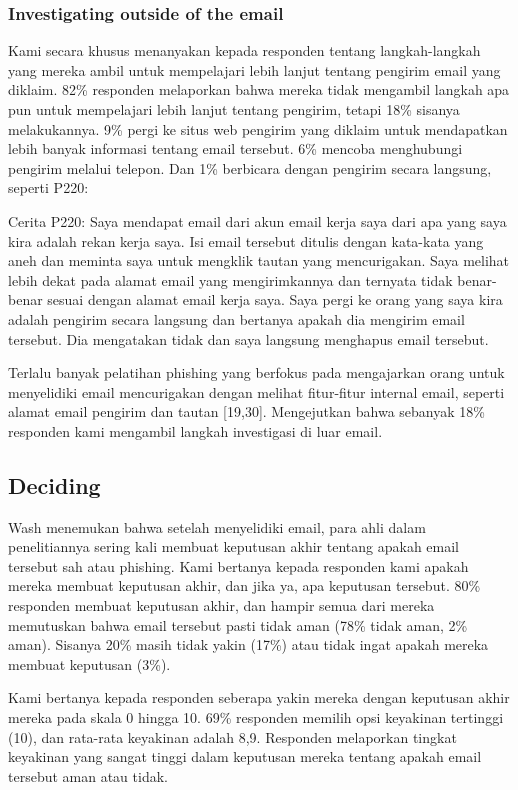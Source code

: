 \documentclass[lettersize,journal]{IEEEtran}
\begin{document}
\subsubsection{Investigating outside of the email}

Kami secara khusus menanyakan kepada responden tentang langkah-langkah yang
mereka ambil untuk mempelajari lebih lanjut tentang pengirim email yang
diklaim. 82\% responden melaporkan bahwa mereka tidak mengambil langkah apa pun
untuk mempelajari lebih lanjut tentang pengirim, tetapi 18\% sisanya
melakukannya. 9\% pergi ke situs web pengirim yang diklaim untuk mendapatkan
lebih banyak informasi tentang email tersebut. 6\% mencoba menghubungi pengirim
melalui telepon. Dan 1\% berbicara dengan pengirim secara langsung, seperti
P220:

Cerita P220: Saya mendapat email dari akun email kerja saya dari apa yang saya
kira adalah rekan kerja saya. Isi email tersebut ditulis dengan kata-kata yang
aneh dan meminta saya untuk mengklik tautan yang mencurigakan. Saya melihat
lebih dekat pada alamat email yang mengirimkannya dan ternyata tidak
benar-benar sesuai dengan alamat email kerja saya. Saya pergi ke orang yang
saya kira adalah pengirim secara langsung dan bertanya apakah dia mengirim
email tersebut. Dia mengatakan tidak dan saya langsung menghapus email
tersebut.

Terlalu banyak pelatihan phishing yang berfokus pada mengajarkan orang untuk
menyelidiki email mencurigakan dengan melihat fitur-fitur internal email,
seperti alamat email pengirim dan tautan [19,30]. Mengejutkan bahwa sebanyak
18\% responden kami mengambil langkah investigasi di luar email.

\subsection{Deciding}

Wash \cite{tigaempat} menemukan bahwa setelah menyelidiki email, para ahli
dalam penelitiannya sering kali membuat keputusan akhir tentang apakah email
tersebut sah atau phishing. Kami bertanya kepada responden kami apakah mereka
membuat keputusan akhir, dan jika ya, apa keputusan tersebut. 80\% responden
membuat keputusan akhir, dan hampir semua dari mereka memutuskan bahwa email
tersebut pasti tidak aman (78\% tidak aman, 2\% aman). Sisanya 20\% masih tidak
yakin (17\%) atau tidak ingat apakah mereka membuat keputusan (3\%).

Kami bertanya kepada responden seberapa yakin mereka dengan keputusan akhir
mereka pada skala 0 hingga 10. 69\% responden memilih opsi keyakinan tertinggi
(10), dan rata-rata keyakinan adalah 8,9. Responden melaporkan tingkat
keyakinan yang sangat tinggi dalam keputusan mereka tentang apakah email
tersebut aman atau tidak.
\end{document}
